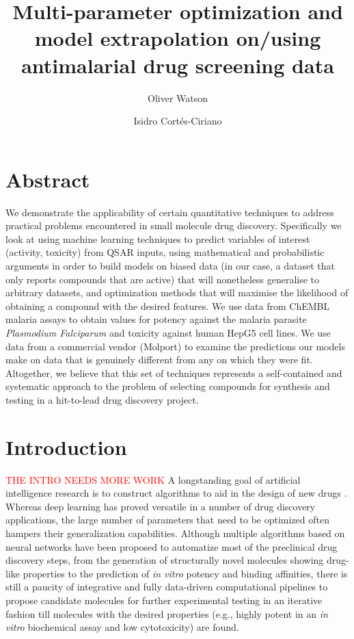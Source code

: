 \documentclass{article}
\title{Multi-parameter optimization and model extrapolation on/using antimalarial drug screening data}
\author[1]{Oliver Watson}
\author[2]{Isidro Cortés-Ciriano}
\affil[1]{Evariste Technologies Ltd}
\affil[2]{Centre for Molecular Informatics, Department of Chemistry, University of Cambridge, Lensfield Road, Cambridge, CB2 1EW, United Kingdom.}
\begin{document}

\maketitle

\section{Abstract}

We demonstrate the applicability of certain quantitative techniques to address practical problems encountered in small molecule drug discovery.  Specifically we look at using machine learning techniques to predict variables of interest (activity, toxicity) from QSAR inputs, using mathematical and probabilistic arguments in order to build models on biased data (in our case, a dataset that only reports compounds that are active) that will nonetheless generalise to arbitrary datasets, and optimization methods that will maximise the likelihood of obtaining a compound with the desired features.  We use data from ChEMBL malaria assays to obtain values for potency against the malaria parasite \textit{Plasmodium Falciparum} and toxicity against human HepG5 cell lines.  We use data from a commercial vendor (Molport) to examine the predictions our models make on data that is genuinely different from any on which they were fit. Altogether, we believe that this set of techniques represents a self-contained and systematic approach to the problem of selecting compounds for synthesis and testing in a hit-to-lead drug discovery project.

\newpage


\section{Introduction}
\textcolor{red}{THE INTRO NEEDS MORE WORK}
A longstanding goal of artificial intelligence research is to construct algorithms 
to aid in the design of new drugs \cite{Gawehn2016,Chen2018}. 
Whereas deep learning has proved versatile in a number of drug discovery applications\cite{Chen2018}, 
the large number of parameters that need to be optimized often hampers their generalization capabilities. Although multiple algorithms based on neural networks have been proposed to automatize most of the preclinical drug discovery steps, from the generation of structurally novel molecules showing drug-like properties\cite{Kang2018} to the prediction of {\it in vitro} potency and binding affinities\cite{Ozturk2018}, there is still a paucity of integrative and fully data-driven computational pipelines to propose candidate molecules for further experimental testing in an iterative fashion till molecules with the desired properties (e.g., highly potent in an {\it in vitro} biochemical assay and low cytotoxicity) are found.
\end{document}

